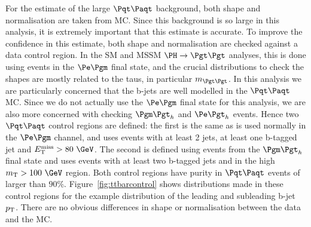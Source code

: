 For the estimate of the large $\ttbar$ background, both shape and normalisation
are taken from \ac{MC}. Since this background is so large in this analysis, it
is extremely important that this estimate is accurate. To improve the confidence
in this estimate, both shape and normalisation are checked against a data
control region. In the \ac{SM} and \ac{MSSM} $\HToTauTau$ analyses, this is done
using events in the $\emu$ final state, and the crucial distributions to check
the shapes are mostly related to the taus, in particular $m_{\Pgt\Pgt}$. In this
analysis we are particularly concerned that the b-jets are well modelled in the
$\ttbar$ \ac{MC}. Since we do not actually use the $\emu$ final state for this
analysis, we are also more concerned with checking $\mutau$ and $\etau$ events.
Hence two $\ttbar$ control regions are defined: the first is the same as is used
normally in the $\emu$ channel, and uses events with at least 2 jets, at least
one b-tagged jet and $\MET>80~\GeV$. The second is defined using events from the
$\mutau$ final state and uses events with at least two b-tagged jets and in the
high $m_{\text{T}}>100~\GeV$ region. Both control regions have purity in
$\ttbar$ events of larger than $90\%$. Figure~\ref{fig:ttbarcontrol} shows
distributions made in these control regions for the example distribution of the
leading and subleading b-jet $p_{\mathrm{T}}$. There are no obvious differences in shape or
normalisation between the data and the \ac{MC}.

